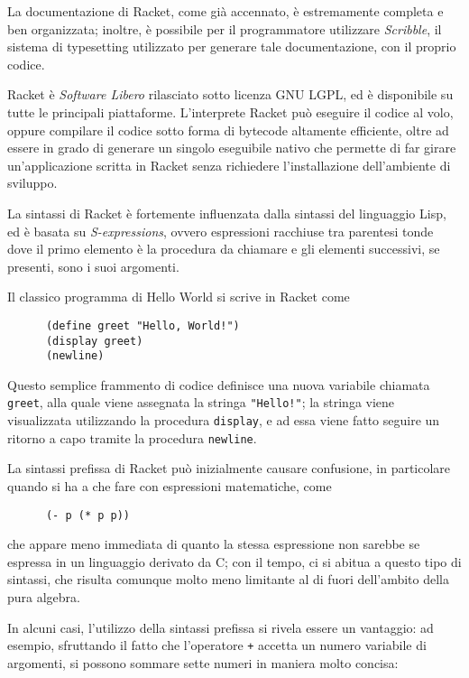 La documentazione di Racket, come gi\`a accennato, \`e estremamente
completa e ben organizzata; inoltre, \`e possibile per il programmatore
utilizzare \emph{Scribble}, il sistema di typesetting utilizzato per
generare tale documentazione, con il proprio codice.

Racket \`e \emph{Software Libero} rilasciato sotto licenza GNU LGPL, ed
\`e disponibile su tutte le principali piattaforme. L'interprete Racket
pu\`o eseguire il codice al volo, oppure compilare il codice sotto forma
di bytecode altamente efficiente, oltre ad essere in grado di generare
un singolo eseguibile nativo che permette di far girare un'applicazione
scritta in Racket senza richiedere l'installazione dell'ambiente di
sviluppo.

La sintassi di Racket \`e fortemente influenzata dalla sintassi del
linguaggio Lisp, ed \`e basata su \emph{S-expressions}, ovvero espressioni
racchiuse tra parentesi tonde dove il primo elemento \`e la procedura
da chiamare e gli elementi successivi, se presenti, sono i suoi
argomenti.

Il classico programma di Hello World si scrive in Racket come

\begin{lstlisting}
      (define greet "Hello, World!")
      (display greet)
      (newline)
\end{lstlisting}

Questo semplice frammento di codice definisce una nuova variabile
chiamata \lstinline{greet}, alla quale viene assegnata la stringa
\lstinline{"Hello!"}; la stringa viene visualizzata utilizzando la
procedura \lstinline{display}, e ad essa viene fatto seguire un
ritorno a capo tramite la procedura \lstinline{newline}.

La sintassi prefissa di Racket pu\`o inizialmente causare confusione,
in particolare quando si ha a che fare con espressioni matematiche,
come

\begin{lstlisting}
      (- p (* p p))
\end{lstlisting}

che appare meno immediata di quanto la stessa espressione non sarebbe
se espressa in un linguaggio derivato da C; con il tempo, ci si abitua
a questo tipo di sintassi, che risulta comunque molto meno limitante
al di fuori dell'ambito della pura algebra.

In alcuni casi, l'utilizzo della sintassi prefissa si rivela essere un
vantaggio: ad esempio, sfruttando il fatto che l'operatore \lstinline{+}
accetta un numero variabile di argomenti, si possono sommare sette numeri
in maniera molto concisa:


